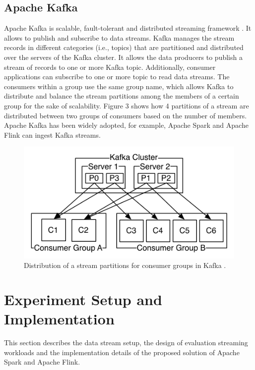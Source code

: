 \documentclass[]{article}
\begin{document}
\subsection{Apache Kafka}
\par Apache Kafka is scalable, fault-tolerant and distributed streaming framework \cite{kafka}. It allows to publish and subscribe to data streams.
Kafka manages the stream records in different categories (i.e., topics) that are partitioned and distributed over the servers of the Kafka cluster. It allows the data producers to publish a stream of records to one or more  Kafka topic. Additionally, consumer applications can subscribe to one or more topic to read data streams. The consumers within a group use the  same group name, which allows Kafka to distribute and balance the stream partitions among the  members of a certain group for the sake of scalability. Figure 3 shows how 4 partitions of a stream are distributed between two groups of consumers based on the number of members. 
Apache Kafka has been widely  adopted, for example, 
Apache Spark and Apache Flink can ingest Kafka streams. 

\begin{figure}[h]
 
  \centering
    \includegraphics[width=\textwidth, height=.3\textheight]{kafka_groups.png}
     \caption{ Distribution of a stream partitions for consumer groups in Kafka \cite{kafka}.}
\end{figure} 

\section{Experiment Setup and Implementation}
This section describes the data stream setup, the design of evaluation streaming workloads and the  implementation details of the proposed solution of Apache Spark and Apache Flink.
\end{document}
